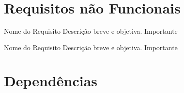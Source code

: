 \documentclass{article}
\begin{document}
\section{Requisitos não Funcionais}

  \begin{nonfunctional}
    \requirement
    {Nome do Requisito}
    {Descrição breve e objetiva.}
    {Importante}

    \requirement
    {Nome do Requisito}
    {Descrição breve e objetiva.}
    {Importante}
  \end{nonfunctional}

\section{Dependências}

  \begin{dependencies}

\end{dependencies}  

% 
% 
\end{document}
